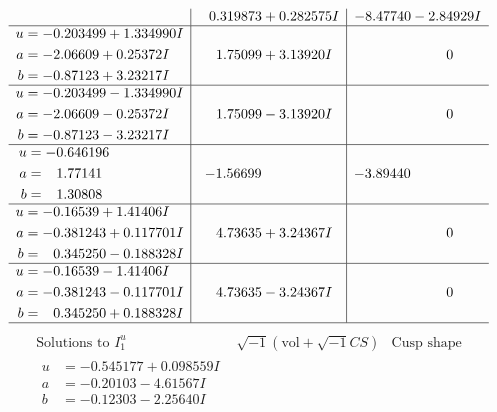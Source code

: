 \documentclass[1p]{elsarticle_modified}
\theoremstyle{definition}
\newcommand{\I}{\sqrt{-1}}
\begin{document}
$$\begin{array}{c|c|c}
 & \phantom{-}0.319873 + 0.282575 I & -8.47740 - 2.84929 I \\ \hline\begin{aligned}
u &= -0.203499 + 1.334990 I \\
a &= -2.06609 + 0.25372 I \\
b &= -0.87123 + 3.23217 I\end{aligned}
 & \phantom{-}1.75099 + 3.13920 I & \phantom{-0.000000 } 0 \\ \hline\begin{aligned}
u &= -0.203499 - 1.334990 I \\
a &= -2.06609 - 0.25372 I \\
b &= -0.87123 - 3.23217 I\end{aligned}
 & \phantom{-}1.75099 - 3.13920 I & \phantom{-0.000000 } 0 \\ \hline\begin{aligned}
u &= -0.646196\phantom{ +0.000000I} \\
a &= \phantom{-}1.77141\phantom{ +0.000000I} \\
b &= \phantom{-}1.30808\phantom{ +0.000000I}\end{aligned}
 & -1.56699\phantom{ +0.000000I} & -3.89440\phantom{ +0.000000I} \\ \hline\begin{aligned}
u &= -0.16539 + 1.41406 I \\
a &= -0.381243 + 0.117701 I \\
b &= \phantom{-}0.345250 - 0.188328 I\end{aligned}
 & \phantom{-}4.73635 + 3.24367 I & \phantom{-0.000000 } 0 \\ \hline\begin{aligned}
u &= -0.16539 - 1.41406 I \\
a &= -0.381243 - 0.117701 I \\
b &= \phantom{-}0.345250 + 0.188328 I\end{aligned}
 & \phantom{-}4.73635 - 3.24367 I & \phantom{-0.000000 } 0\\
 \hline 
 \end{array}$$\newpage$$\begin{array}{c|c|c}  
\text{Solutions to }I^u_{1}& \I (\text{vol} + \sqrt{-1}CS) & \text{Cusp shape}\\
 \hline 
\begin{aligned}
u &= -0.545177 + 0.098559 I \\
a &= -0.20103 - 4.61567 I \\
b &= -0.12303 - 2.25640 I\end{aligned}

\end{array}$$
\end{document}
